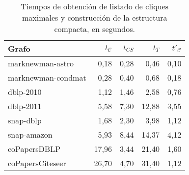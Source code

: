 \begin{table}
	\caption{Tiempos de obtención de listado de cliques maximales y construcción de la estructura compacta, en segundos.}
	\label{table:constructTimes}
	\centering
	\begin{tabular}{l|r|r|r|r}
		\toprule
		Grafo & $t_{\mathcal{C}}$ & $t_{CS}$ & $t_{T}$ & $t'_{\mathcal{C}}$ \\
		\midrule
		marknewman-astro & 0,18 & 0,28 & 0,46 & 0,10  \\
		marknewman-condmat & 0,28 & 0,40 & 0,68 & 0,18 \\
		dblp-2010 & 1,12 & 1,46 & 2,58 & 0,76  \\
         dblp-2011 & 5,58 & 7,30 & 12,88 & 3,55 \\
		snap-dblp & 1,68 & 2,30 & 3,98 & 1,12 \\
         snap-amazon & 5,93 & 8,44 & 14,37 & 4,12 \\
         coPapersDBLP & 17,96 & 3,44 & 21,40 & 1,60 \\
         coPapersCiteseer & 26,70 & 4,70 & 31,40 & 1,12 \\
         \bottomrule
	\end{tabular}
\end{table}